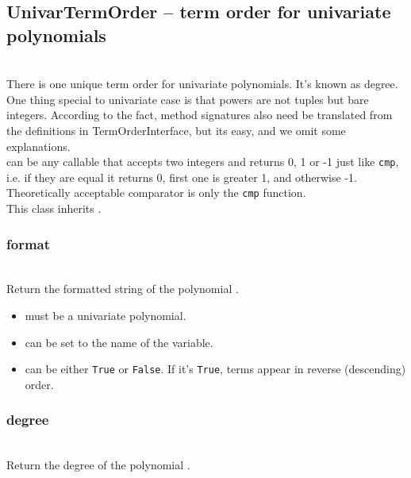   \subsection{UnivarTermOrder -- term order for univariate polynomials}
  \initialize
  \\
  \spacing
  \quad There is one unique term order for univariate polynomials.
  It's known as degree.\\
  \quad One thing special to univariate case is that powers are not tuples
  but bare integers.
  According to the fact, method signatures also need be translated from
  the definitions in TermOrderInterface, but its easy, and we omit
  some explanations.\\
  \spacing
  \quad {} can be any callable that accepts two integers
  and returns 0, 1 or -1 just like {\tt cmp}, i.e. if they are equal
  it returns 0, first one is greater 1, and otherwise -1.
  Theoretically acceptable comparator is only the {\tt cmp} function.\\
  \spacing
  \quad This class inherits .
  \method
  \subsubsection{format}
  \\
  \spacing
  \quad Return the formatted string of the polynomial .\\
  \spacing
  \begin{itemize}
  \item {} must be a univariate polynomial.
  \item {} can be set to the name of the variable.
  \item {} can be either {\tt True} or {\tt False}.
    If it's {\tt True}, terms appear in reverse (descending) order.
  \end{itemize}

  \subsubsection{degree}
  \\
  \spacing
  \quad Return the degree of the polynomial .

